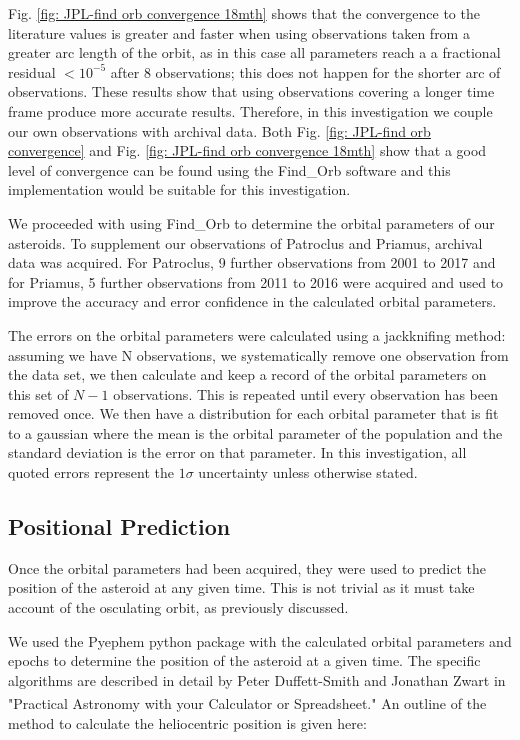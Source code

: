 \documentclass[10pt, twocolumn]{revtex4}    %
\begin{document}
Fig. \ref{fig: JPL-find orb convergence 18mth} shows that the convergence to the literature values is greater and faster when using observations taken from a greater arc length of the orbit, as in this case all parameters reach a a fractional residual $<10^{-5}$ after 8 observations; this does not happen for the shorter arc of observations. These results show that using observations covering a longer time frame produce more accurate results. Therefore, in this investigation we couple our own observations with archival data. Both Fig. \ref{fig: JPL-find orb convergence} and Fig. \ref{fig: JPL-find orb convergence 18mth} show that a good level of convergence can be found using the Find\_Orb software and this implementation would be suitable for this investigation.

We proceeded with using Find\_Orb to determine the orbital parameters of our asteroids. To supplement our observations of Patroclus and Priamus, archival data was acquired. For Patroclus, 9 further observations from 2001 to 2017 and for Priamus, 5 further observations from 2011 to 2016 were acquired and used to improve the accuracy and error confidence in the calculated orbital parameters.

The errors on the orbital parameters were calculated using a jackknifing method: assuming we have N observations, we systematically remove one observation from the data set, we then calculate and keep a record of the orbital parameters on this set of $N-1$ observations. This is repeated until every observation has been removed once. We then have  a distribution for each orbital parameter that is fit to a gaussian where the mean is the orbital parameter of the population and the standard deviation is the error on that parameter. In this investigation, all quoted errors represent the $1\sigma$ uncertainty unless otherwise stated.

\subsection*{Positional Prediction}

Once the orbital parameters had been acquired, they were used to predict the position of the asteroid at any given time. This is not trivial as it must take account of the osculating orbit, as previously discussed.

We used the Pyephem python package with the calculated orbital parameters and epochs to determine the position of the asteroid at a given time. The specific algorithms are described in detail by Peter Duffett-Smith and Jonathan Zwart in "Practical Astronomy with your Calculator or Spreadsheet."\textsuperscript{\cite[p.121-130]{Duffett-SmithPracticalastronomyyour2011}} An outline of the method to calculate the heliocentric position is given here:
\end{document}
